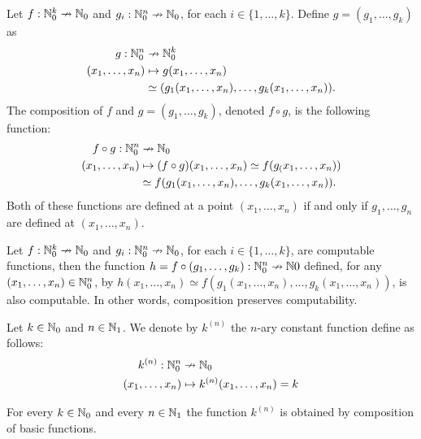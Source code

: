 \begin{definition}
	Let $f : \mathbb{N}_0^k \nrightarrow \mathbb{N}_0$ and $g_i : \mathbb{N}_0^n \nrightarrow \mathbb{N}_0$, for each $i \in \{ 1, \ldots, k \}$. Define $g = (g_1, \ldots, g_k)$ as  
	\begin{align*}
	g : \mathbb{N}_0^n  & \nrightarrow  \mathbb{N}_0^k \\
	(x_1, \ldots, x_n)  & \mapsto  g(x_1, \ldots, x_n) \\ 
	& \simeq (g_1(x_1, \ldots, x_n), \ldots, g_k(x_1, \ldots, x_n)).
	\end{align*}
	The composition of $f$ and $g = (g_1, \ldots, g_k)$, denoted $f \circ g$, is the following function:
	\begin{align*}
		f \circ g : \mathbb{N}_0^n & \nrightarrow \mathbb{N}_0 \\
		(x_1, \ldots, x_n) & \mapsto (f \circ g)(x_1, \ldots, x_n) \simeq f(g_(x_1, \ldots, x_n)) \\
				   & \simeq f(g_1(x_1, \ldots, x_n), \ldots, g_k(x_1, \ldots, x_n)).
	\end{align*}
Both of these functions are defined at a point $(x_1, \ldots, x_n)$ if and only if $g_1, \ldots, g_n$ are defined at $(x_1, \ldots, x_n)$.
\end{definition}

\begin{theorem}
	Let $f:\mathbb{N}_0^k \nrightarrow \mathbb{N}_0$ and $g_i : \mathbb{N}_0^n \nrightarrow \mathbb{N}_0$, for each $i \in \{ 1, \ldots, k \}$, are computable functions, then the function $h = f \circ ( g_1, \ldots, g_k) : \mathbb{N}_0^n \nrightarrow \mathbb{N}0$ defined, for any $(x_1, \ldots, x_n) \in \mathbb{N}_0^n$, by $h(x_1, \ldots, x_n) \simeq f(g_1(x_1, \ldots, x_n), \ldots, g_k(x_1, \ldots, x_n))$, is also computable. In other words, composition preserves computability.
\end{theorem}

\begin{definition}
	Let $k \in \mathbb{N}_0$ and $n \in \mathbb{N}_1$. We denote by $k^{(n)}$ the $n$-ary constant function define as follows:
	\begin{align*}
		k^{(n)} : \mathbb{N}_0^n & \nrightarrow \mathbb{N}_0 \\
		(x_1, \ldots, x_n) & \mapsto k^{(n)}(x_1, \ldots, x_n) = k
	\end{align*}
\end{definition}

\begin{theorem}
	For every $k \in \mathbb{N}_0$ and every $n \in \mathbb{N}_1$ the function $k^{(n)}$ is obtained by composition of basic functions.
\end{theorem}

